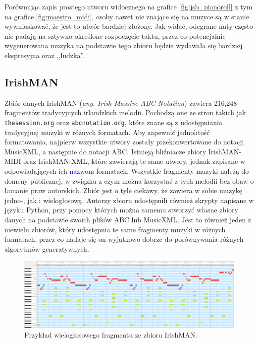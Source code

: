 \documentclass[data-science]{agh-wi} %
\begin{document}
Porównując zapis prostego utworu widocznego na grafice \ref*{fig:jsb_pianoroll} z tym na grafice \ref*{fig:maestro_midi}, osoby nawet nie znające się na muzyce są w stanie wywnioskować, że jest to utwór bardziej złożony. Jak widać, odegrane nuty często nie padają na sztywno określone rozpoczęcie taktu, przez co potencjalnie wygenerowana muzyka na podstawie tego zbioru będzie wydawała się bardziej ekspresyjna oraz ,,ludzka''.

\subsection{IrishMAN}
Zbiór danych IrishMAN (\textit{ang. Irish Massive ABC Notation}) \cite{irishman} zawiera 216,248 fragmentów tradycyjnych irlandzkich melodii. Pochodzą one ze stron takich jak \texttt{thesession.org} oraz \texttt{abcnotation.org}, które znane są z udostępniania tradycyjnej muzyki w różnych formatach. Aby zapewnić jednolitość formatowania, najpierw wszystkie utwory zostały przekonwertowane do notacji MusicXML, a następnie do notacji ABC. Istnieją bliźniacze zbiory IrishMAN-MIDI oraz IrishMAN-XML, które zawierają te same utwory, jednak zapisane w odpowiadających ich \textcolor{blue}{nazwom} formatach. Wszystkie fragmenty muzyki należą do domeny publicznej, w związku z czym można korzystać z tych melodii bez obaw o łamanie praw autorskich. Zbiór jest o tyle ciekawy, że zawiera w sobie muzykę jedno-, jak i wielogłosową. Autorzy zbioru udostępnili również skrypty napisane w języku Python, przy pomocy których można samemu stworzyć własne zbiory danych na podstawie swoich plików ABC lub MusicXML. Jest to również jeden z niewielu zbiorów, który udostępnia te same fragmenty muzyki w różnych formatach, przez co nadaje się on wyjątkowo dobrze do porównywania różnych algorytmów generatywnych.

\begin{figure}[ht!]
    \begin{center}
        \includegraphics[width=0.9\linewidth]{./img/irishman_midi.png}
    \end{center}
    \caption{Przykład wielogłosowego fragmentu ze zbioru IrishMAN.}\label{fig:irish_midi}
\end{figure}
\end{document}
